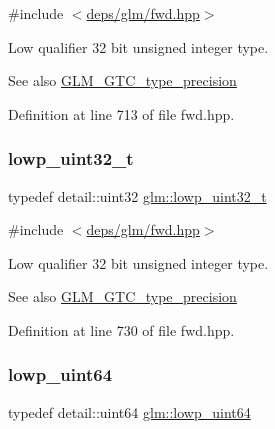 {\ttfamily \#include $<$\hyperlink{fwd_8hpp}{deps/glm/fwd.\+hpp}$>$}

Low qualifier 32 bit unsigned integer type. \begin{DoxySeeAlso}{See also}
\hyperlink{group__gtc__type__precision}{G\+L\+M\+\_\+\+G\+T\+C\+\_\+type\+\_\+precision} 
\end{DoxySeeAlso}


Definition at line 713 of file fwd.\+hpp.

\mbox{\label{group__gtc__type__precision_ga9f8cb602a358e1f48bda2682cf051f0c}} 
\subsubsection{\texorpdfstring{lowp\+\_\+uint32\+\_\+t}{lowp\_uint32\_t}}
{\footnotesize\ttfamily typedef detail\+::uint32 \hyperlink{group__gtc__type__precision_ga9f8cb602a358e1f48bda2682cf051f0c}{glm\+::lowp\+\_\+uint32\+\_\+t}}



{\ttfamily \#include $<$\hyperlink{fwd_8hpp}{deps/glm/fwd.\+hpp}$>$}

Low qualifier 32 bit unsigned integer type. \begin{DoxySeeAlso}{See also}
\hyperlink{group__gtc__type__precision}{G\+L\+M\+\_\+\+G\+T\+C\+\_\+type\+\_\+precision} 
\end{DoxySeeAlso}


Definition at line 730 of file fwd.\+hpp.

\mbox{\label{group__gtc__type__precision_gacf666a9d9b309c4615c7a4f2ab0be289}} 
\subsubsection{\texorpdfstring{lowp\+\_\+uint64}{lowp\_uint64}}
{\footnotesize\ttfamily typedef detail\+::uint64 \hyperlink{group__gtc__type__precision_gacf666a9d9b309c4615c7a4f2ab0be289}{glm\+::lowp\+\_\+uint64}}



